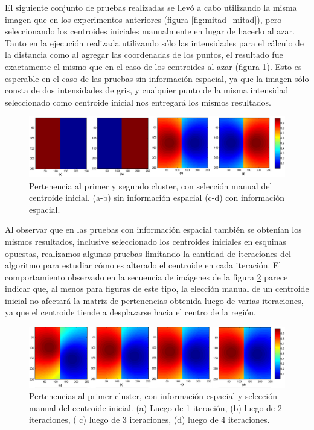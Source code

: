El siguiente conjunto de pruebas realizadas se llevó a cabo utilizando la misma imagen que en los experimentos anteriores (figura \ref{fig:mitad_mitad}), pero seleccionando los centroides iniciales manualmente en lugar de hacerlo al azar. Tanto en la ejecución realizada utilizando sólo las intensidades para el cálculo de la distancia como al agregar las coordenadas de los puntos, el resultado fue exactamente el mismo que en el caso de los centroides al azar (figura \ref{fig:ejecucion_mitad_mitad_centroides_manuales}). Esto es esperable en el caso de las pruebas sin información espacial, ya que la imagen sólo consta de dos intensidades de gris, y cualquier punto de la misma intensidad seleccionado como centroide inicial nos entregará los mismos resultados.

\begin{figure}[H]
\centering
\includegraphics[scale=0.08]{images/mitad_mitad_001.jpg}
\caption{Pertenencia al primer y segundo cluster, con selección manual del centroide inicial. (a-b) sin información espacial (c-d) con información espacial.}
\label{fig:ejecucion_mitad_mitad_centroides_manuales}
\end{figure}

Al observar que en las pruebas con información espacial también se obtenían los mismos resultados, inclusive  seleccionado los centroides iniciales en esquinas opuestas, realizamos algunas pruebas limitando la cantidad de iteraciones del algoritmo para estudiar cómo es alterado el centroide en cada iteración. El comportamiento observado en la secuencia de imágenes de la figura \ref{fig:ejecucion_mitad_mitad_iteraciones} parece indicar que, al menos para figuras de este tipo, la elección manual de un centroide inicial no afectará la matriz de pertenencias obtenida luego de varias iteraciones, ya que el centroide tiende a desplazarse hacia el centro de la región.

\begin{figure}[H]
\centering
\includegraphics[scale=0.08]{images/mitad_mitad_iteracion_x1.jpg}
\caption{Pertenencias al primer cluster, con información espacial y selección manual del centroide inicial. (a) Luego de 1 iteración, (b) luego de 2 iteraciones, ( c) luego de 3 iteraciones, (d) luego de 4 iteraciones.}
\label{fig:ejecucion_mitad_mitad_iteraciones}
\end{figure}

